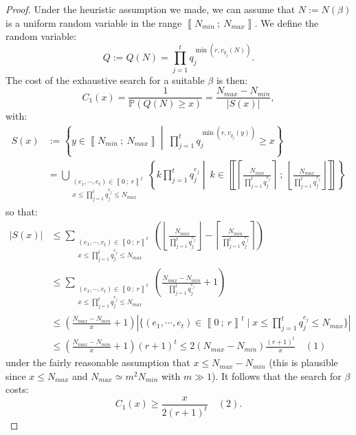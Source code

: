 \documentclass[a4paper,10pt,notitlepage]{report}
\theoremstyle{definition}
\theoremstyle{plain}
\theoremstyle{definition}
\renewcommand{\i}[2]{\left\llbracket #1~;~#2\right\rrbracket}
\renewcommand{\(}{\left(}
\renewcommand{\)}{\right)}
\renewcommand{\P}{\mathbb{P}}
\begin{document}
\begin{proof}
Under the heuristic assumption we made, we can assume that $N:=N(\beta)$ is a uniform random variable in the range $\i{N_{min}}{N_{max}}$.  We define the random variable:
\[Q:=Q(N)=\prod_{j=1}^t q_j^{\min(r,v_{q_j}(N))}.\]
The cost of the exhaustive search for a suitable $\beta$ is then:
\[C_1(x)=\frac{1}{\P(Q(N)\geq x)}=\frac{N_{max}-N_{min}}{|S(x)|},\]
with:
\begin{align*}S(x)&:=\left\{y\in\i{N_{min}}{N_{max}}\middle | \ \prod_{j=1}^t q_j^{\min(r,v_{q_j}(y))}\geq x\right\}\\
&=\bigcup_{\substack{(e_1, \cdots, e_t)\in\i{0}{r}^t\\x\leq \prod_{j=1}^t q_j^{e_j}\leq N_{max}}}\left\{k\prod_{j=1}^t q_j^{e_j}\middle | \ k\in\i{\left\lceil\frac{N_{min}}{\prod_{j=1}^t q_j^{e_j}}\right\rceil}{\left\lfloor\frac{N_{max}}{\prod_{j=1}^t q_j^{e_j}}\right\rfloor}\right\}
\end{align*}
so that:
\begin{align*}
|S(x)|&\leq \sum_{\substack{(e_1, \cdots, e_t)\in\i{0}{r}^t\\x\leq \prod_{j=1}^t q_j^{e_j}\leq N_{max}}}\(\left\lfloor\frac{N_{max}}{\prod_{j=1}^t q_j^{e_j}}\right\rfloor-\left\lceil\frac{N_{min}}{\prod_{j=1}^t q_j^{e_j}}\right\rceil\)\\
&\leq \sum_{\substack{(e_1, \cdots, e_t)\in\i{0}{r}^t\\x\leq \prod_{j=1}^t q_j^{e_j}\leq N_{max}}}\(\frac{N_{max}-N_{min}}{\prod_{j=1}^t q_j^{e_j}}+1\)\\
&\leq\(\frac{N_{max}-N_{min}}{x}+1\)|\{(e_1, \cdots, e_t)\in\i{0}{r}^t\mid x\leq \prod_{j=1}^t q_j^{e_j}\leq N_{max}\}|\\
&\leq\(\frac{N_{max}-N_{min}}{x}+1\)(r+1)^t\leq 2(N_{max}-N_{min})\frac{(r+1)^t}{x} \quad (1)
\end{align*}
under the fairly reasonable assumption that $x\leq N_{max}-N_{min}$ (this is plausible since $x\leq N_{max}$ and $N_{max}\simeq m^2 N_{min}$ with $m\gg 1$). It follows that the search for $\beta$ costs:
\[C_1(x)\geq  \frac{x}{2(r+1)^t}\quad (2).\]


\end{proof}
\end{document}
